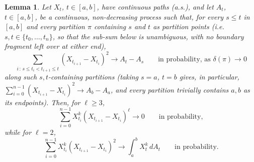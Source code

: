 \documentclass[11pt,fleqn]{article}
\theoremstyle{plain}
\newtheorem{lemma}[thm]{Lemma}
\theoremstyle{remark}
\begin{document}
\begin{lemma}\label{lem:l2}
Let $X_t$, $t\in[a,b]$, have continuous paths (a.s.), and let $A_t$,
$t\in[a,b]$, be a continuous, non-decreasing process such that, for
every $s\le t$ in $[a,b]$ and every partition $\pi$ \emph{containing}
$s$ and $t$ as partition points (i.e.\ $s,t\in\{t_0,\ldots,t_n\}$, so
that the sub-sum below is unambiguous, with no boundary fragment left
over at either end),
\[
\sum_{i\,:\,s\le t_i<t_{i+1}\le t}(X_{t_{i+1}}-X_{t_i})^2
\longrightarrow A_t-A_s\qquad\text{in probability, as }\delta(\pi)\to0
\]
along such $s,t$-containing partitions (taking $s=a$, $t=b$ gives, in
particular, $\sum_{i=0}^{n-1}(X_{t_{i+1}}-X_{t_i})^2\to A_b-A_a$, and
every partition trivially contains $a,b$ as its endpoints). Then, for
$\ell\ge3$,
\[
\sum_{i=0}^{n-1}X_{t_i}^k(X_{t_{i+1}}-X_{t_i})^\ell\longrightarrow0
\qquad\text{in probability},
\]
while for $\ell=2$,
\[
\sum_{i=0}^{n-1}X_{t_i}^k(X_{t_{i+1}}-X_{t_i})^2\longrightarrow\int_a^bX_t^k\,dA_t
\qquad\text{in probability}.
\]
\end{lemma}
\end{document}
